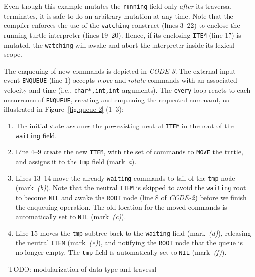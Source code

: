 \documentclass{acm_proc_article-sp}
\newcommand{\code}[1] {{\small{\texttt{#1}}}}
\begin{document}
Even though this example mutates the \code{running} field only \emph{after} its 
traversal terminates, it is safe to do an arbitrary mutation at any time.
Note that the compiler enforces the use of the \code{watching} construct (lines 
3--22) to enclose the running turtle interpreter (lines 19--20).
Hence, if its enclosing \code{ITEM} (line 17) is mutated, the \code{watching} 
will awake and abort the interpreter inside its lexical scope.

The enqueuing of new commands is depicted in \emph{CODE-3}.
The external input event \code{ENQUEUE} (line 1) accepts \emph{move} and 
\emph{rotate} commands with an associated velocity and time (i.e., 
\code{char*,int,int} arguments).
The \code{every} loop reacts to each occurrence of \code{ENQUEUE}, creating and 
enqueuing the requested command, as illustrated in Figure~\ref{fig.queue-2} 
(1--3):
%
\begin{enumerate}[start=0]
%
\item The initial state assumes the pre-existing neutral \code{ITEM} in the 
root of the \code{waiting} field.
%
\item Line 4--9 create the new \code{ITEM}, with the set of commands to 
\code{MOVE} the turtle, and assigns it to the \code{tmp} field (mark~\emph{a}).
%
\item Lines 13--14 move the already \code{waiting} commands to tail of the 
\code{tmp} node (mark~\emph{(b)}).
Note that the neutral \code{ITEM} is skipped to avoid the \code{waiting} root 
to become \code{NIL} and awake the \code{ROOT} node (line 8 of \emph{CODE-2}) 
before we finish the enqueuing operation.
The old location for the moved commands is automatically set to \code{NIL} 
(mark~\emph{(c)}).
%
\item Line 15 moves the \code{tmp} subtree back to the \code{waiting} field 
(mark~\emph{(d)}), releasing the neutral \code{ITEM} (mark~\emph{(e)}), and 
notifying the \code{ROOT} node that the queue is no longer empty.
The \code{tmp} field is automatically set to \code{NIL} (mark~\emph{(f)}).
%
\end{enumerate}
%

- TODO: modularization of data type and travesal
\end{document}
